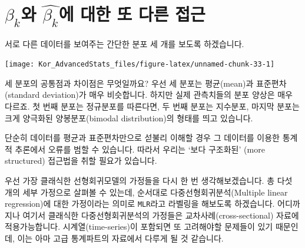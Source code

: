 \documentclass[
]{book}
\begin{document}
\hypertarget{beta_kuxc640-hatbeta_kuxc5d0-uxb300uxd55c-uxb610-uxb2e4uxb978-uxc811uxadfc}{%
\section{\texorpdfstring{\(\beta_k\)와 \(\hat{\beta_k}\)에 대한 또 다른 접근}{\textbackslash beta\_k와 \textbackslash hat\{\textbackslash beta\_k\}에 대한 또 다른 접근}}\label{beta_kuxc640-hatbeta_kuxc5d0-uxb300uxd55c-uxb610-uxb2e4uxb978-uxc811uxadfc}}

서로 다른 데이터를 보여주는 간단한 분포 세 개를 보도록 하겠습니다.

\begin{center}\texttt{[image: Kor\_AdvancedStats\_files/figure-latex/unnamed-chunk-33-1]} \end{center}

세 분포의 공통점과 차이점은 무엇일까요? 우선 세 분포는 평균(mean)과 표준편차(standard deviation)가 매우 비슷합니다. 하지만 실제 관측치들의 분포 양상은 매우 다르죠. 첫 번째 분포는 정규분포를 따른다면, 두 번째 분포는 지수분포, 마지막 분포는 크게 양극화된 양봉분포(bimodal distribution)의 형태를 띄고 있습니다.

단순히 데이터를 평균과 표준편차만으로 섣불리 이해할 경우 그 데이터를 이용한 통계적 추론에서 오류를 범할 수 있습니다. 따라서 우리는 `보다 구조화된' (more structured) 접근법을 취할 필요가 있습니다.

우선 가장 클래식한 선형회귀모델의 가정들을 다시 한 번 생각해보겠습니다. 총 다섯 개의 세부 가정으로 살펴볼 수 있는데, 순서대로 다중선형회귀분석(Multiple linear regression)에 대한 가정이라는 의미로 \texttt{MLR}라고 라벨링을 해보도록 하겠습니다. 어디까지나 여기서 클래식한 다중선형회귀분석의 가정들은 교차사례(cross-sectional) 자료에 적용가능합니다. 시계열(time-series)이 포함되면 또 고려해야할 문제들이 있기 때문인데, 이는 아마 고급 통계파트의 자료에서 다루게 될 것 같습니다.
\end{document}
